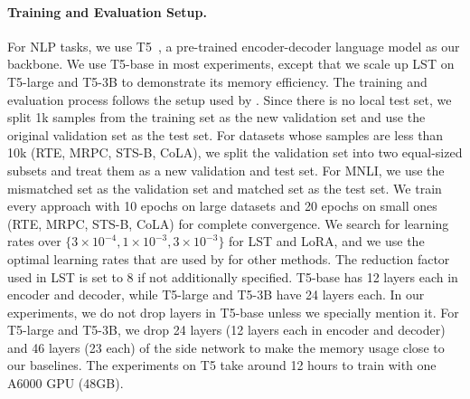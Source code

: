 \paragraph{Training and Evaluation Setup.} For NLP tasks, we use T5~\cite{raffel2020exploring}, a pre-trained encoder-decoder language model as our backbone. We use T5-base in most experiments, except that we scale up LST on T5-large and T5-3B to demonstrate its memory efficiency. The training and evaluation process follows the setup used by \citet{mahabadi2021compacter}.
Since there is no local test set, we split 1k samples from the training set as the new validation set and use the original validation set as the test set. For datasets whose samples are less than 10k (RTE, MRPC, STS-B, CoLA), we split the validation set into two equal-sized subsets and treat them as a new validation and test set. For MNLI, we use the mismatched set as the validation set and matched set as the test set. We train every approach with 10 epochs on large datasets and 20 epochs on small ones (RTE, MRPC, STS-B, CoLA) for complete convergence. We search for learning rates over $\{3 \times 10^{-4}, 1 \times 10^{-3}, 3 \times 10^{-3} \}$ for LST and LoRA\cite{hu2021lora}, and we use the optimal learning rates that are used by \citet{mahabadi2021compacter} for other methods. The reduction factor used in LST is set to 8 if not additionally specified. T5-base has 12 layers each in encoder and decoder, while T5-large and T5-3B have 24 layers each. In our experiments, we do not drop layers in T5-base unless we specially mention it. For T5-large and T5-3B, we drop 24 layers (12 layers each in encoder and decoder) and 46 layers (23 each) of the side network to make the memory usage close to our baselines. The experiments on T5 take around 12 hours to train with one A6000 GPU (48GB).

